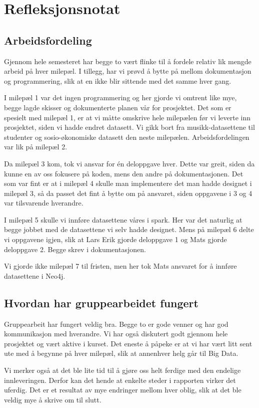 \section{Refleksjonsnotat}
\subsection{Arbeidsfordeling}
Gjennom hele semesteret har begge to vært flinke til å fordele relativ lik mengde arbeid på hver milepæl. I tillegg, har vi prøvd å bytte på mellom dokumentasjon og programmering, slik at en ikke blir sittende med det samme hver gang.

I milepæl 1 var det ingen programmering og her gjorde vi omtrent like mye, begge lagde skisser og dokumenterte planen vår for prosjektet. Det som er spesielt med milepæl 1, er at vi måtte omskrive hele milepælen før vi leverte inn prosjektet, siden vi hadde endret datasett. Vi gikk bort fra musikk-datasettene til studenter og sosio-økonomiske datasett den neste milepælen. Arbeidsfordelingen var lik på milepæl 2.

Da milepæl 3 kom, tok vi ansvar for én deloppgave hver. Dette var greit, siden da kunne en av oss fokusere på koden, mens den andre på dokumentasjonen. Det som var fint er at i milepæl 4 skulle man implementere det man hadde designet i milepæl 3, så da passet det fint å bytte om på ansvaret, siden oppgavene i 3 og 4 var tilsvarende hverandre.

I milepæl 5 skulle vi innføre datasettene våres i spark. Her var det naturlig at begge jobbet med de datasettene vi selv hadde designet. Mens på milepæl 6 delte vi oppgavene igjen, slik at Lars Erik gjorde deloppgave 1 og Mats gjorde deloppgave 2. Begge skrev i dokumentasjonen.

Vi gjorde ikke milepæl 7 til fristen, men her tok Mats ansvaret for å innføre datasettene i Neo4j.

\subsection{Hvordan har gruppearbeidet fungert}
Gruppearbeit har fungert veldig bra. Begge to er gode venner og har god kommunikasjon med hverandre. Vi har også diskutert godt gjennom hele prosjektet og vært aktive i kurset. Det eneste å påpeke er at vi har vært litt sent ute med å begynne på hver milepæl, slik at annenhver helg går til Big Data.

Vi merker også at det ble lite tid til å gjøre oss helt ferdige med den endelige innleveringen. Derfor kan det hende at enkelte steder i rapporten virker det uferdig. Det er et resultat av mye endringer mellom hver oblig, slik at det ble veldig mye å skrive om til slutt. 